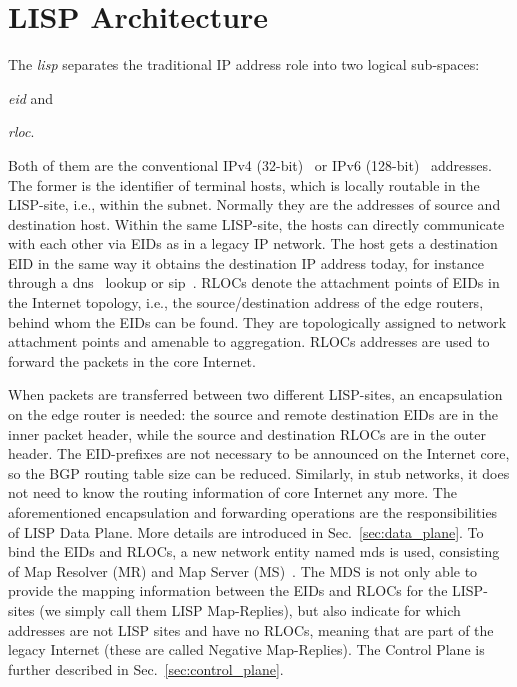 \section{LISP Architecture}
\label{sec:background_lisp}

The \emph{\acrfull{lisp}} separates the traditional IP address role into two logical sub-spaces:
\begin{inparaenum}[(i)]
	\item \emph{\acrfull{eid}} and
	\item \emph{\acrfull{rloc}}.
\end{inparaenum}
Both of them are the conventional IPv4 (32-bit)~\cite{rfc07911981internet} or IPv6 (128-bit)~\cite{deering1998rfc} addresses. The former is the identifier of terminal hosts, which is locally routable in the LISP-site, i.e., within the subnet. Normally they are the addresses of source and destination host. Within the same LISP-site, the hosts can directly communicate with each other via EIDs as in a legacy IP network. The host gets a destination EID in the same way it obtains the destination IP address today, for instance through a \acrfull{dns}~\cite{mockapetrisrfc} lookup or \acrfull{sip}~\cite{rosenbergsip}. RLOCs denote the attachment points of EIDs in the Internet topology, i.e., the source/destination address of the edge routers, behind whom the EIDs can be found. They are topologically assigned to network attachment points and amenable to aggregation. RLOCs addresses are used to forward the packets in the core Internet. 

When packets are transferred between two different LISP-sites, an encapsulation on the edge router is needed: the source and remote destination EIDs are in the inner packet header, while the source and destination RLOCs are in the outer header. %
The EID-prefixes are not necessary to be announced on the Internet core, so the BGP routing table size can be reduced. Similarly, in stub networks, it does not need to know the routing information of core Internet any more. The aforementioned encapsulation and forwarding operations are the responsibilities of LISP Data Plane. More details are introduced in Sec.~\ref{sec:data_plane}. To bind the EIDs and RLOCs, a new network entity named \acrfull{mds} is used, consisting of Map Resolver (MR) and Map Server (MS)~\cite{rfc6833}. The MDS is not only able to provide the mapping information between the EIDs and RLOCs for the LISP-sites (we simply call them LISP Map-Replies), but also indicate for which addresses are not LISP sites and have no RLOCs, meaning that are part of the legacy Internet (these are called Negative Map-Replies). The Control Plane is further described in Sec.~\ref{sec:control_plane}.


